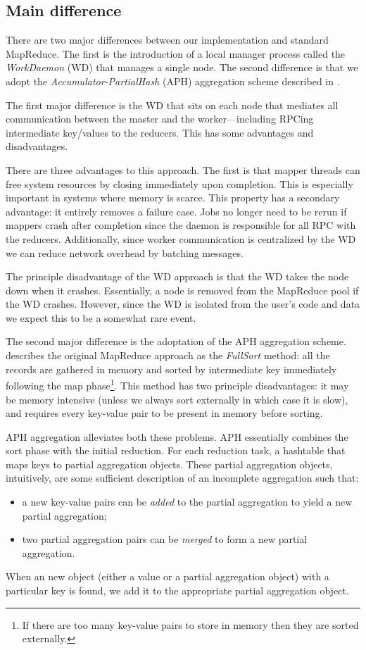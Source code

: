 \documentclass[10pt,letter,final,article,twocolumn]{article} %
\begin{document}
\subsection{Main difference}

There are two major differences between our implementation and standard MapReduce. The first is the introduction of a local manager process called the \emph{WorkDaemon} (WD) that manages a single node. The second difference is that we adopt the \emph{Accumulator-PartialHash} (APH) aggregation scheme described in \citet{yu2009distributed}.

The first major difference is the WD that sits on each node that mediates all communication between the master and the worker---including RPCing intermediate key/values to the reducers. This has some advantages and disadvantages.

There are three advantages to this approach. The first is that mapper threads can free system resources by closing immediately upon completion. This is especially important in systems where memory is scarce. This property has a secondary advantage: it entirely removes a failure case. Jobs no longer need to be rerun if mappers crash after completion since the daemon is responsible for all RPC with the reducers. Additionally, since worker communication is centralized by the WD we can reduce network overhead by batching messages.

The principle disadvantage of the WD approach is that the WD takes the node down when it crashes.  Essentially, a node is removed from the MapReduce pool if the WD crashes. However, since the WD is isolated from the user's code and data we expect this to be a somewhat rare event.

The second major difference is the adoptation of the APH aggregation scheme. \citet{yu2009distributed} describes the original MapReduce approach as the \emph{FullSort} method: all the records are gathered in memory and sorted by intermediate key immediately following the map phase\footnote{If there are too many key-value pairs to store in memory then they are sorted externally.}. This method has two principle disadvantages: it may be memory intensive (unless we always sort externally in which case it is slow), and requires every key-value pair to be present in memory before sorting. 

 APH aggregation alleviates both these problems. APH essentially combines the sort phase with the initial reduction. For each reduction task, a hashtable that maps keys to partial aggregation objects. These partial aggregation objects, intuitively, are some sufficient description of an incomplete aggregation such that:
\begin{itemize}
 \item a new key-value pairs can be \emph{added} to the partial aggregation to yield a new partial aggregation;
 \item two partial aggregation pairs can be \emph{merged} to form a new partial aggregation.
\end{itemize}
When an new object (either a value or a partial aggregation object) with a particular key is found, we add it to the appropriate partial aggregation object.
\end{document}
